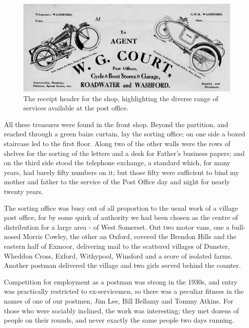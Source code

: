 \begin{figure}
	\centering
     \includegraphics[width=1\textwidth]{figures/Receipt}
     \caption{The receipt header for the shop, highlighting the diverse range of services available at the post office.}
     \label{fig:Receipt}
\end{figure}

All these treasures were found in the front shop. Beyond the partition, and reached through a green baize curtain, lay the sorting office; on one side a boxed staircase led to the first floor. Along two of the other walls were the rows of shelves for the sorting of the letters and a desk for Father's business papers; and on the third side stood the telephone exchange, a standard which, for many years, had barely fifty numbers on it; but those fifty were sufficient to bind my mother and father to the service of the Post Office day and night for nearly twenty years.

The sorting office was busy out of all proportion to the usual work of a village post office, for by some quirk of authority we had been chosen as the centre of distribution for a large area - of West Somerset. Out two motor vans, one a bull-nosed Morris Cowley, the other an Oxford, covered the Brendon Hills and the eastern half of Exmoor, delivering mail to the scattered villages of Dunster, Wheddon Cross, Exford, Withypool, Winsford and a score of isolated farms. Another postman delivered the village and two girls served behind the counter.

Competition for employment as a postman was strong in the 1930s, and entry was practically restricted to ex-servicemen, so there was a peculiar fitness in the names of one of our postmen, Jim Lee, Bill Bellamy and Tommy Atkins. For those who were sociably inclined, the work was interesting; they met dozens of people on their rounds, and never exactly the same people two days running.


